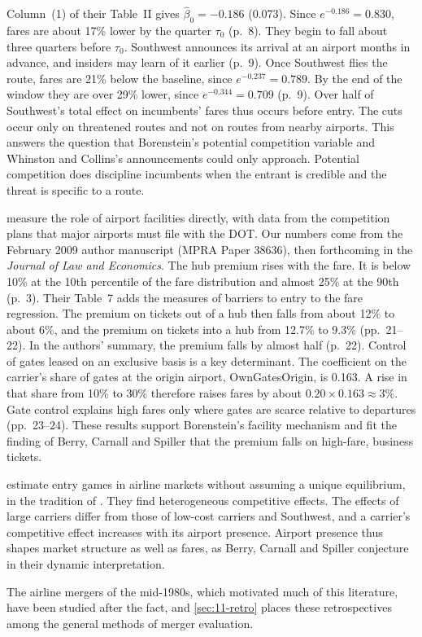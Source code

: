 Column~(1) of their Table~II gives $\hat\beta_0 = -0.186$ (0.073). Since $e^{-0.186} = 0.830$, fares are
about 17\% lower by the quarter $\tau_0$ (p.~8). They begin to fall about three quarters before $\tau_0$.
Southwest announces its arrival at an airport months in advance, and insiders may learn of it earlier
(p.~9). Once Southwest flies the route, fares are 21\% below the baseline, since $e^{-0.237} = 0.789$. By
the end of the window they are over 29\% lower, since $e^{-0.344} = 0.709$ (p.~9). Over half of Southwest's
total effect on incumbents' fares thus occurs before entry. The cuts occur only on threatened routes and not
on routes from nearby airports. This answers the question that Borenstein's potential
competition variable and Whinston and Collins's announcements could only approach. Potential competition does
discipline incumbents when the entrant is credible and the threat is specific to a route.

\citet{CilibertoWilliams2010} measure the role of airport facilities directly, with data from the competition
plans that major airports must file with the DOT. Our numbers come from the February 2009 author manuscript
(MPRA Paper 38636), then forthcoming in the \emph{Journal of Law and Economics}. The hub premium rises with
the fare. It is below 10\% at the 10th percentile of the fare distribution and almost 25\% at the 90th
(p.~3). Their Table~7 adds the measures of barriers to entry to the fare regression. The premium on tickets
out of a hub then falls from about 12\% to about 6\%, and the premium on tickets into a hub from 12.7\% to
9.3\% (pp.~21--22). In the authors' summary, the premium falls by almost half (p.~22). Control of gates leased on an exclusive basis is
a key determinant. The coefficient on the carrier's share of gates at the origin airport, OwnGatesOrigin, is
0.163. A rise in that share from 10\% to 30\% therefore raises fares by about $0.20 \times 0.163 \approx 3\%$.
Gate control explains high fares only where gates are scarce relative to departures (pp.~23--24). These
results support Borenstein's facility mechanism and fit the
finding of Berry, Carnall and Spiller that the premium falls on high-fare, business tickets.

\citet{CilibertoTamer2009} estimate entry games in airline markets without assuming a unique equilibrium,
in the tradition of \citet{Berry1992}. They find heterogeneous competitive effects. The effects of large
carriers differ from those of low-cost carriers and Southwest, and a carrier's competitive effect increases
with its airport presence. Airport presence thus shapes market structure as well as fares, as Berry, Carnall
and Spiller conjecture in their dynamic interpretation.

The airline mergers of the mid-1980s, which motivated much of this literature, have been studied after the
fact, and \cref{sec:11-retro} places these retrospectives among the general methods of merger evaluation.
